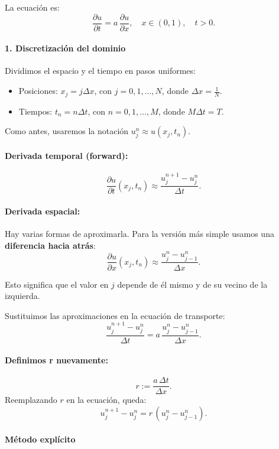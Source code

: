 \documentclass[12pt,a4paper]{article}
\begin{document}
La ecuación es:
\[
\frac{\partial u}{\partial t} = a\,\frac{\partial u}{\partial x}, 
\quad x \in (0,1), \quad t > 0.
\]

\paragraph{1. Discretización del dominio}

Dividimos el espacio y el tiempo en pasos uniformes:
\begin{itemize}
    \item Posiciones: \(x_j = j\Delta x\), con \(j = 0,1,\dots,N\), donde \(\Delta x = \frac{1}{N}\).
    \item Tiempos: \(t_n = n\Delta t\), con \(n = 0,1,\dots,M\), donde \(M\Delta t = T\).
\end{itemize}

Como antes, usaremos la notación \(u_j^n \approx u(x_j, t_n)\).

\paragraph{Derivada temporal (forward):}

\[
\frac{\partial u}{\partial t}(x_j, t_n) \approx \frac{u_j^{n+1}-u_j^n}{\Delta t}.
\]

\paragraph{Derivada espacial:}  
Hay varias formas de aproximarla. Para la versión más simple usamos una \textbf{diferencia hacia atrás}:
\[
\frac{\partial u}{\partial x}(x_j, t_n) \approx \frac{u_j^n - u_{j-1}^n}{\Delta x}.
\]

Esto significa que el valor en \(j\) depende de él mismo y de su vecino de la izquierda.

Sustituimos las aproximaciones en la ecuación de transporte:
\[
\frac{u_j^{n+1}-u_j^n}{\Delta t} = a\,\frac{u_j^n - u_{j-1}^n}{\Delta x}.
\]

\paragraph{Definimos r nuevamente:}
\[
r := \frac{a\,\Delta t}{\Delta x}.
\]
Reemplazando \(r\) en la ecuación, queda:
\[
u_j^{n+1}-u_j^n = r\,(u_j^n - u_{j-1}^n).
\]

\paragraph{Método explícito}
\end{document}

